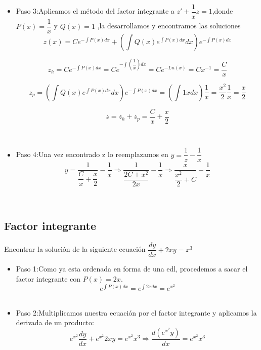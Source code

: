 \documentclass[10pt,a4paper]{article}
\begin{document}
{{{{{{{{{{{{\begin{itemize}
\,\\
\item Paso 3:Aplicamos el método del factor integrante  a $z'+\dfrac{1}{x}z=1$,donde $P(x)=\dfrac{1}{x}$ y $Q(x)=1$ ,la desarrollamos y encontramos las soluciones
\begin{equation*}
z(x)=Ce^{-\int P(x)dx}+(\int Q(x)e^{\int P(x)dx}dx)e^{-\int P(x)dx}
\end{equation*}

\begin{equation}\tag {solución homogenea $ (z_h)$}
z_h=Ce^{-\int P(x)dx}=Ce^{-\int(\dfrac{1}{x})dx}=Ce^{-Ln(x)}=Cx^{-1}=\dfrac{C}{x}
\end{equation}

\begin{equation}\tag {solución particular $ (z_p)$}
z_p=(\int Q(x)e^{\int P(x)dx}dx)e^{-\int P(x)dx}=(\int1xdx)\dfrac{1}{x}=\dfrac{x^2}{2}\dfrac{1}{x}=\dfrac{x}{2}
\end{equation}

\begin{equation}\tag {solución homogenea $ (z_h)$}
z=z_h+z_p=\dfrac{C}{x}+\dfrac{x}{2}
\end{equation}


\,\\
\item Paso 4:Una vez encontrado z lo reemplazamos en $y=\dfrac{1}{z}-\dfrac{1}{x}$
\begin{equation*}
y=\dfrac{1}{\dfrac{C}{x}+\dfrac{x}{2}}-\dfrac{1}{x}\Rightarrow \dfrac{1}{\dfrac{2C+x^2}{2x}}-\dfrac{1}{x}\Rightarrow \dfrac{x}{\dfrac{x^2}{2}+ C}-\dfrac{1}{x}
\end{equation*}

\end{itemize}
\,\\
\subsection{Factor integrante}
Encontrar  la solución de la siguiente ecuación $\dfrac{dy}{dx}+2xy=x ^3$ 
\begin{itemize}
\item Paso 1:Como ya esta ordenada en forma de una edl, procedemos a sacar el factor integrante con $P(x)=2x$.
\begin{equation*}
e ^{\int P(x)dx}=e ^{\int 2xdx}=e^{x^2}
\end{equation*}
\,\\

\item Paso 2:Multiplicamos nuestra ecuación por el factor integrante y aplicamos la derivada de un producto:
\begin{equation*}
e^{x^2}\dfrac{dy}{dx}+e^{x^2}2xy=e^{x^2}x^3\Rightarrow \dfrac{d(e^{x^2}y)}{dx}=e^{x^2}x^3
\end{equation*}
\,\\


\end{itemize}}}}}}}}}}}}}
\end{document}

